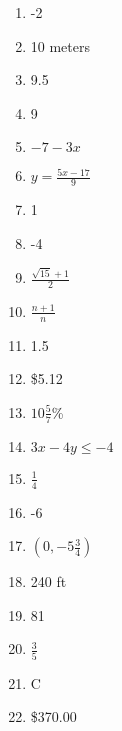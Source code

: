 \documentclass[../uilmath.tex]{subfiles}
\begin{document}
\begin{enumerate}[label=\bfseries\arabic*.]
    \item %
    -2

    \item %
    10 meters 

    \item %
    9.5 

    \item %
    9

    \item %
    $-7-3x$

    \item %
    $y=\frac{5x-17}{9}$

    \item %
    1 

    \item %
    -4 

    \item %
    $\frac{\sqrt{15}+1}{2}$

    \item %
    $\frac{n+1}{n}$

    \item %
    1.5

    \item %
    \$5.12 

    \item %
    $10\frac{5}{7}$\%

    \item %
    $3x-4y\leq -4$

    \item %
    $\frac{1}{4}$

    \item %
    -6

    \item %
    $(0,-5\frac{3}{4})$

    \item %
    240 ft 

    \item %
    81

    \item %
    $\frac{3}{5}$

    \item %
    C 

    \item %
    \$370.00


\end{enumerate}
\end{document}
